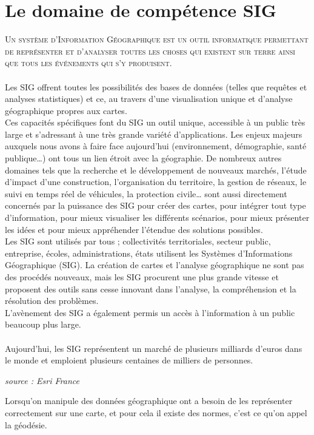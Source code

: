 \section{Le domaine de compétence SIG}
\textsc{
Un système d’Information Géographique est un outil informatique permettant de représenter et d’analyser toutes les choses qui existent sur terre ainsi que tous les événements qui s’y produisent.
}\\\\
Les SIG offrent toutes les possibilités des bases de données (telles que requêtes et analyses statistiques) et ce, au travers d’une visualisation unique et d’analyse géographique propres aux cartes.
\\Ces capacités spécifiques font du SIG un outil unique, accessible à un public très large et s’adressant à une très grande variété d’applications.
Les enjeux majeurs auxquels nous avons à faire face aujourd’hui (environnement, démographie, santé publique…) ont tous un lien étroit avec la géographie.
De nombreux autres domaines tels que la recherche et le développement de nouveaux marchés, l’étude d’impact d’une construction, l’organisation du territoire, la gestion de réseaux, le suivi en temps réel de véhicules, la protection civile… sont aussi directement concernés par la puissance des SIG pour créer des cartes, pour intégrer tout type d’information, pour mieux visualiser les différents scénarios, pour mieux présenter les idées et pour mieux appréhender l’étendue des solutions possibles.
\\Les SIG sont utilisés par tous ; collectivités territoriales, secteur public, entreprise, écoles, administrations, états utilisent les Systèmes d’Informations Géographique (SIG). La création de cartes et l’analyse géographique ne sont pas des procédés nouveaux, mais les SIG procurent une plus grande vitesse et proposent des outils sans cesse innovant dans l’analyse, la compréhension et la résolution des problèmes.
\\L’avènement des SIG a également permis un accès à l’information à un public beaucoup plus large.
\\\\
Aujourd’hui, les SIG représentent un marché de plusieurs milliards d'euros dans le monde et emploient plusieurs centaines de milliers de personnes.
\begin{flushright}
\textit{source : Esri France}
\end{flushright}
\newpage
Lorsqu'on manipule des données géographique ont a besoin de les représenter correctement sur une carte, et pour cela il existe des normes, c'est ce qu'on appel la géodésie.

